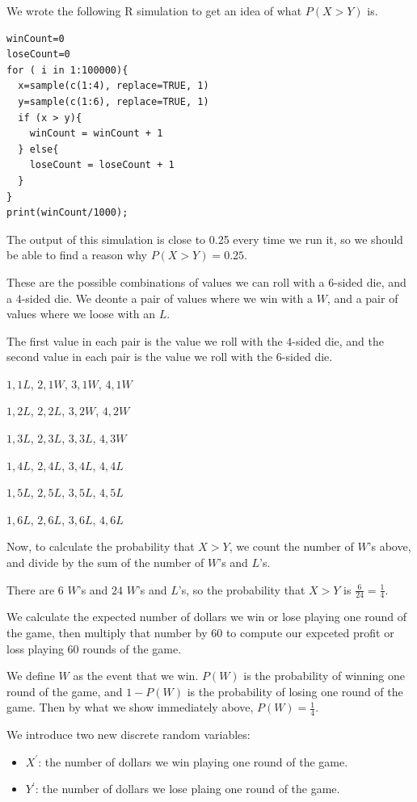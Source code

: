 \documentclass[a4paper,11pt]{article}
\begin{document}
We wrote the following R simulation to get an idea of what
$P \left(X > Y \right)$ is.

\begin{lstlisting}
winCount=0
loseCount=0
for ( i in 1:100000){
  x=sample(c(1:4), replace=TRUE, 1)
  y=sample(c(1:6), replace=TRUE, 1)
  if (x > y){
    winCount = winCount + 1
  } else{
    loseCount = loseCount + 1
  }
}
print(winCount/1000);
\end{lstlisting}

The output of this simulation is close to 0.25 every time we run it, so
we should be able to find a reason why $P \left(X > Y \right) = 0.25$.

These are the possible combinations of values we can roll with a $6$-sided
die, and a $4$-sided die. We deonte a pair of values where we win with a
$W$, and a pair of values where we loose with an $L$.

The first value in each pair is the value we roll with the $4$-sided die, and
the second value in each pair is the value we roll with the $6$-sided die.

$1, 1 L$, $2, 1 W$, $3, 1 W$, $4, 1 W$

$1 ,2 L$, $2, 2 L$, $3, 2 W$, $4, 2 W$

$1 ,3 L$, $2, 3 L$, $3, 3 L$, $4, 3 W$

$1 ,4 L$, $2, 4 L$, $3, 4 L$, $4, 4 L$

$1 ,5 L$, $2, 5 L$, $3, 5 L$, $4, 5 L$

$1 ,6 L$, $2, 6 L$, $3, 6 L$, $4, 6 L$

Now, to calculate the probability that $X > Y$, we count the number of $W$'s
above, and divide by the sum of the number of $W$'s and $L$'s.

There are $6$ $W$'s  and $24$ $W$'s and $L$'s, so the probability that
$X > Y$ is $\frac{6}{24} = \frac{1}{4}$.

We calculate the expected number of dollars we win or lose playing one round
of the game, then multiply that number by 60 to compute our expceted profit
or loss playing 60 rounds of the game.

We define $W$ as the event that we win. $P\left( W \right)$ is the probability
of winning one round of the game, and $1-P\left( W \right)$ is the probability
of losing one round of the game. Then by what we show immediately above,
$P\left( W \right) = \frac{1}{4}$.

We introduce two new discrete random variables:
\begin{itemize}
	\item $X^{\prime}$: the number of dollars we win playing one round of the
		game.
	\item $Y^{\prime}$: the number of dollars we lose plaing one round of the
		game.
\end{itemize}
\end{document}
